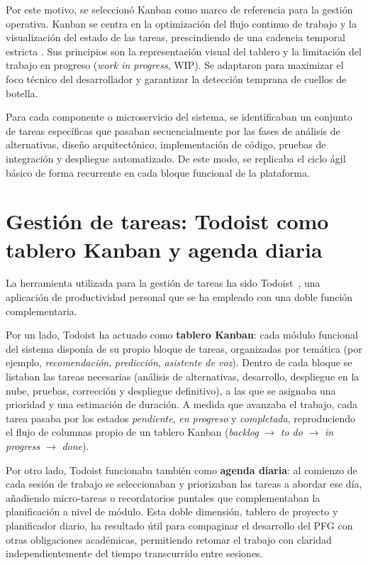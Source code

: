Por este motivo, se seleccionó Kanban como marco de referencia para la gestión operativa.
Kanban se centra en la optimización del flujo continuo de trabajo y la visualización del estado de las tareas,
prescindiendo de una cadencia temporal estricta \cite{anderson2010kanban}.
Sus principios son la representación visual del tablero y la limitación del trabajo en progreso (\textit{work in progress}, WIP).
Se adaptaron para maximizar el foco técnico del desarrollador y garantizar la detección temprana de cuellos de botella.

Para cada componente o microservicio del sistema, se identificaban un conjunto de tareas específicas que pasaban secuencialmente
por las fases de análisis de alternativas, diseño arquitectónico, implementación de código, pruebas de integración y despliegue automatizado.
De este modo, se replicaba el ciclo ágil básico de forma recurrente en cada bloque funcional de la plataforma.

\section{Gestión de tareas: Todoist como tablero Kanban y agenda diaria}

La herramienta utilizada para la gestión de tareas ha sido Todoist~\cite{Todoist2026},
una aplicación de productividad personal que se ha empleado con una doble función complementaria.

Por un lado, Todoist ha actuado como \textbf{tablero Kanban}: cada módulo funcional del
sistema disponía de su propio bloque de tareas, organizadas por temática
(por ejemplo, \textit{recomendación}, \textit{predicción}, \textit{asistente de voz}).
Dentro de cada bloque se listaban las tareas necesarias (análisis de alternativas,
desarrollo, despliegue en la nube, pruebas, corrección y despliegue definitivo),
a las que se asignaba una prioridad y una estimación de duración. A medida que avanzaba el
trabajo, cada tarea pasaba por los estados \textit{pendiente}, \textit{en progreso}
y \textit{completada}, reproduciendo el flujo de columnas propio de un tablero
Kanban (\textit{backlog} $\rightarrow$ \textit{to do} $\rightarrow$ \textit{in progress} $\rightarrow$ \textit{done}).

Por otro lado, Todoist funcionaba también como \textbf{agenda diaria}: al comienzo de
cada sesión de trabajo se seleccionaban y priorizaban las tareas a abordar ese día,
añadiendo micro-tareas o recordatorios puntales que complementaban la planificación a
nivel de módulo. Esta doble dimensión, tablero de proyecto y planificador diario, ha resultado
útil para compaginar el desarrollo del PFG con otras obligaciones académicas,
permitiendo retomar el trabajo con claridad independientemente del tiempo transcurrido
entre sesiones.

